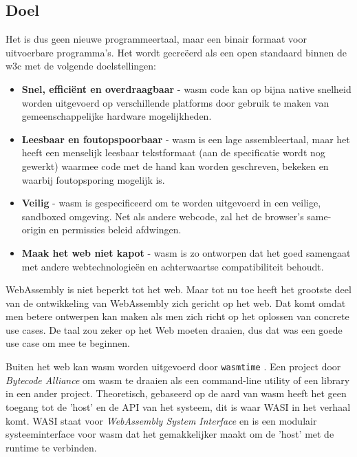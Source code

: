 \subsection{Doel}

Het is dus geen nieuwe programmeertaal, maar een binair formaat voor uitvoerbare programma’s. Het
wordt gecreëerd als een open standaard binnen de \gls{w3c} met de volgende
doelstellingen: 
\begin{itemize}
  \item \textbf{Snel, efficiënt en overdraagbaar} - wasm code kan op bijna native snelheid worden
    uitgevoerd op verschillende platforms door gebruik te maken van gemeenschappelijke hardware
    mogelijkheden. 

  \item \textbf{Leesbaar en foutopspoorbaar} - wasm is een lage assembleertaal, maar het heeft een
    menselijk leesbaar tekstformaat (aan de specificatie wordt nog gewerkt) waarmee code met de hand
    kan worden geschreven, bekeken en waarbij foutopsporing mogelijk is. 

  \item \textbf{Veilig} - wasm is gespecificeerd om te worden uitgevoerd in een veilige, sandboxed
    omgeving. Net als andere webcode, zal het de browser's same-origin en permissies beleid
    afdwingen. 

  \item \textbf{Maak het web niet kapot} - wasm is zo ontworpen dat het goed samengaat met andere
    webtechnologieën en achterwaartse compatibiliteit behoudt.
\end{itemize}

WebAssembly is niet beperkt tot het web. Maar tot nu toe heeft het grootste deel van de ontwikkeling
van WebAssembly zich gericht op het web. Dat komt omdat men betere ontwerpen kan maken als men zich
richt op het oplossen van concrete use cases. De taal zou zeker op het Web moeten draaien, dus dat
was een goede use case om mee te beginnen. \cite{wasm_interfaces}

\clearpage

Buiten het web kan wasm worden uitgevoerd door \texttt{wasmtime} \cite{wasm_time}. Een
project door \textit{Bytecode Alliance} om wasm te draaien als een command-line utility of een
library in een ander project. Theoretisch, gebaseerd op de aard van wasm heeft het geen toegang tot
de 'host' en de API van het systeem, dit is waar WASI in het verhaal komt. WASI staat voor
\textit{WebAssembly System Interface} en is een modulair systeeminterface voor wasm dat het
gemakkelijker maakt om de 'host' met de runtime te verbinden.\cite{wasi}

